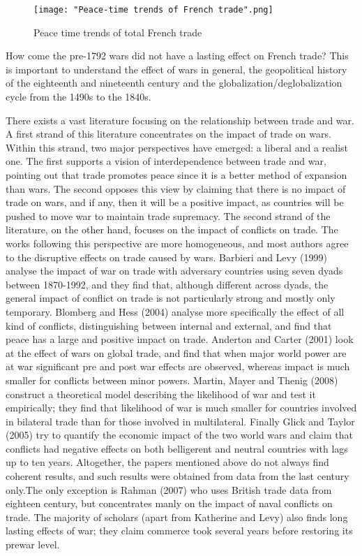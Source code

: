 \documentclass[12pt,a4paper,titlepage,english]{article}
\begin{document}
\begin{figure}
\caption{Peace time trends of total French trade}
\centering
\texttt{[image: "Peace-time trends of French trade".png]}

\label{FrPeaceTrade}
\end{figure}

How come the pre-1792 wars did not have a lasting effect on French trade? This is important to understand the effect of wars in general, the geopolitical history of the eighteenth and nineteenth century and the globalization/deglobalization cycle from the 1490s to the 1840s.

There exists a vast literature focusing on the relationship between trade and war.
A first strand of this literature concentrates on the impact of trade on wars. Within this strand, two major perspectives have emerged: a liberal and a realist one. The first supports a vision of interdependence between trade and war, pointing out that trade promotes peace since it is a better method of expansion than wars. The second opposes this view by claiming that there is no impact of trade on wars, and if any, then it will be a positive impact, as countries will be pushed to move war to maintain trade supremacy.
The second strand of the literature, on the other hand, focuses on the impact of conflicts on trade. The works following this perspective are more homogeneous, and most authors agree to the disruptive effects on trade caused by wars. Barbieri and Levy (1999) analyse the impact of war on trade with adversary countries using seven dyads between 1870-1992, and they find that, although different across dyads, the general impact of conflict on trade is not particularly strong and mostly only temporary. Blomberg and Hess (2004) analyse more specifically the effect of all kind of conflicts, distinguishing between internal and external, and find that peace has a large and positive impact on trade. Anderton and Carter (2001) look at the effect of wars on global trade, and find that when major world power are at war significant pre and post war effects are observed, whereas impact is much smaller for conflicts between minor powers. Martin, Mayer and Thenig (2008) construct a theoretical model describing the likelihood of war and test it empirically; they find that likelihood of war is much smaller for countries involved in bilateral trade than for those involved in multilateral. Finally Glick and Taylor (2005) try to quantify the economic impact of the two world wars and claim that conflicts had negative effects on both belligerent and neutral countries with lags up to ten years. Altogether, the papers mentioned above do not always find coherent results, and such results were obtained from data from the last century only.The only exception is Rahman (2007) who uses British trade data from eighteen century, but concentrates manly on the impact of naval conflicts on trade. The majority of scholars (apart from Katherine and Levy) also finds long lasting effects of war; they claim commerce took several years before restoring its prewar level.
\end{document}
